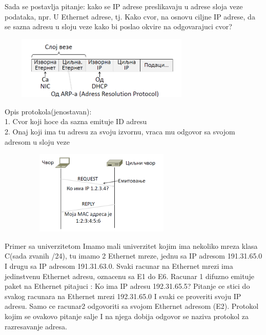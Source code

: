 \documentclass{article} %
\begin{document}
Sada se postavlja pitanje: kako se IP adrese preslikavaju u adrese sloja veze podataka, npr. U Ethernet adrese, tj. Kako cvor, na osnovu ciljne IP adrese, da se sazna adresu u sloju veze kako bi poslao okvire na odgovarajuci cvor?
 \begin{center}
\includegraphics[width=10cm, height=3cm]{slojVeze}\\
\end{center}
Opis protokola(jenostavan):\\
1. Cvor koji hoce da sazna emituje ID adresu\\
2. Onaj koji ima tu adresu za svoju izvornu, vraca mu odgovor sa svojom adresom u sloju veze
 \begin{center}
\includegraphics[width=10cm, height=4cm]{arp}\\
\end{center}
Primer sa univerzitetom
Imamo mali univerzitet kojim ima nekoliko mreza klasa C(sada zvanih /24), tu imamo 2 Ethernet mreze, jednu sa IP adresom 191.31.65.0 I drugu  sa IP adresom 191.31.63.0. Svaki racunar na Ethernet mrezi ima jedinstvenu Ethernet adresu, oznacenu sa E1 do E6. Racunar 1 difuzno emituje paket na Ethernet pitajuci : Ko ima IP adresu 192.31.65.5? Pitanje ce stici do svakog racunara na Ethernet mrezi 192.31.65.0 I svaki ce proveriti svoju IP adresu. Samo ce racunar2 odgovoriti sa svojom Ethernet adresom (E2). Protokol kojim se ovakovo pitanje salje I na njega dobija odgovor se naziva protokol za razresavanje adresa.
\end{document}
